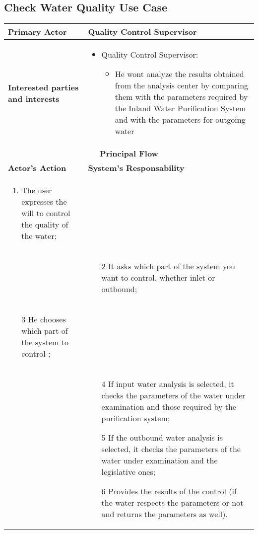 \subsection{Check Water Quality Use Case}

\begin{longtable}{|p{7cm}|p{7cm}|}

\hline
\textbf{Primary Actor} & Quality Control Supervisor
\\


\hline
\textbf{Interested parties and interests} &
\begin{itemize}
\item Quality Control Supervisor:
	\begin{itemize}
 	\item He wont analyze the results obtained from the analysis center by comparing them with the parameters required by the Inland Water Purification System and with the parameters for outgoing water
	\end{itemize}
\end{itemize}
\\


\hline
\multicolumn{2}{|c|}{\textbf{Principal Flow}} \\

\hline
\textbf{Actor's Action} & \textbf{System's Responsability}\\

\hline

\begin{enumerate}
\item The user expresses the will to control the quality of the water;
\end{enumerate} &\\

& 
\begin{enumerate}
\item[2]It asks which part of the system you want to control, whether inlet or outbound;
\end{enumerate}\\

\begin{enumerate}
\item[3]He chooses which part of the system to control	;			
\end{enumerate} &\\


& 
\begin{enumerate}
\item[4]If input water analysis is selected, it checks the parameters of the water under examination and those required by the purification system;
\item[5]If the outbound water analysis is selected, it checks the parameters of the water under examination and the legislative ones;
\item[6]Provides the results of the control (if the water respects the parameters or not and returns the parameters as well).
\end{enumerate}\\

\hline
\end{longtable}

